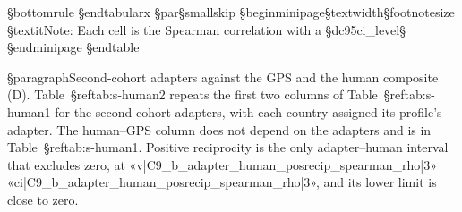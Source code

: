 {§bottomrule
§end{tabularx}
§par§smallskip
§begin{minipage}{§textwidth}§footnotesize
§textit{Note:} Each cell is the Spearman correlation with a §dc{95}{ci_level}§%
§end{minipage}
§end{table}

§paragraph{Second-cohort adapters against the GPS and the human composite (D).} Table~§ref{tab:s-human2} repeats the first two columns of Table~§ref{tab:s-human1} for the second-cohort adapters, with each country assigned its profile's adapter. The human--GPS column does not depend on the adapters and is in Table~§ref{tab:s-human1}. Positive reciprocity is the only adapter--human interval that excludes zero, at «v|C9_b_adapter_human_posrecip_spearman_rho|3» «ci|C9_b_adapter_human_posrecip_spearman_rho|3», and its lower limit is close to zero.

}
